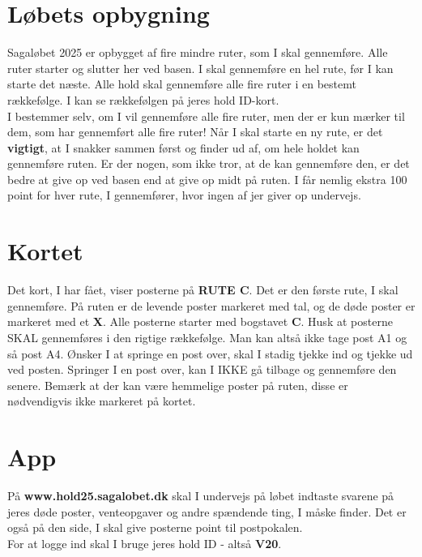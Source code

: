 \section{Løbets opbygning}
Sagaløbet 2025 er opbygget af fire mindre ruter, som I skal gennemføre. Alle ruter starter og slutter her ved basen. I skal gennemføre en hel rute, før I kan starte det næste. Alle hold skal gennemføre alle fire ruter i en bestemt rækkefølge. I kan se rækkefølgen på jeres hold ID-kort.\\\newline
I bestemmer selv, om I vil gennemføre alle fire ruter, men der er kun mærker til dem, som har gennemført alle fire ruter! Når I skal starte en ny rute, er det \textbf{vigtigt}, at I snakker sammen først og finder ud af, om hele holdet kan gennemføre ruten. Er der nogen, som ikke tror, at de kan gennemføre den, er det bedre at give op ved basen end at give op midt på ruten. I får nemlig ekstra 100 point for hver rute, I gennemfører, hvor ingen af jer giver op undervejs.\\
\section{Kortet}
Det kort, I har fået, viser posterne på \textbf{RUTE C}. Det er den første rute, I skal gennemføre. På ruten er de levende poster markeret med tal, og de døde poster er markeret med et \textbf{X}. Alle posterne starter med bogstavet \textbf{C}. Husk at posterne SKAL gennemføres i den rigtige rækkefølge. Man kan altså ikke tage post A1 og så post A4. Ønsker I at springe en post over, skal I stadig tjekke ind og tjekke ud ved posten. Springer I en post over, kan I IKKE gå tilbage og gennemføre den senere. Bemærk at der kan være hemmelige poster på ruten, disse er nødvendigvis ikke markeret på kortet.
\section{App}
På \textbf{www.hold25.sagalobet.dk} skal I undervejs på løbet indtaste svarene på jeres døde poster, venteopgaver og andre spændende ting, I måske finder. Det er også på den side, I skal give posterne point til postpokalen.\\
For at logge ind skal I bruge jeres hold ID - altså \textbf{V20}.
\newpage
